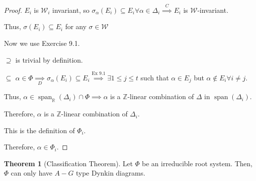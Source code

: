 \documentclass{article}
\theoremstyle{definition}
\newtheorem{theorem}{Theorem}[section]
\begin{document}
\begin{proof}
    \(E_i\) is \(\mathcal{W}_i\) invariant, so \(\sigma_\alpha (E_i) \subseteq E_i \forall \alpha \in \Delta_i \overset{C}{\implies} E_i\) is \(\mathcal{W}\)-invariant.

    Thus, \(\sigma(E_i) \subseteq E_i\) for any \(\sigma\in \mathcal{W}\) 
    
    Now we use Exercise 9.1.

    \(\supseteq\) is trivial by definition.

    \(\subseteq\) \(\alpha \in \Phi \underset{D}{\implies} \sigma_\alpha(E_i) \subseteq E_i \overset{\text{Ex 9.1}}{\implies } \exists 1 \leq j \leq t\) such that \(\alpha \in E_j\) but \(\alpha\notin E_i \forall i \neq j\).
    
    Thus, \(\alpha \in \operatorname{span}_{\mathbb{R}}(\Delta_i) \cap \Phi  \implies \alpha\) is a \(\mathbb{Z}\)-linear combination of \(\Delta\) in \(\operatorname{span}(\Delta_i)\).

    Therefore, \(\alpha\) is a \(\mathbb{Z}\)-linear combination of \(\Delta_i\).

    This is the definition of \(\Phi_i\).

    Therefore, \(\alpha \in \Phi_i\).
    
\end{proof}

\begin{theorem}
    [Classification Theorem]

    Let \(\Phi\) be an irreducible root system. Then, \(\Phi\) can only have \(A-G\) type Dynkin diagrams.
\end{theorem}
\end{document}
